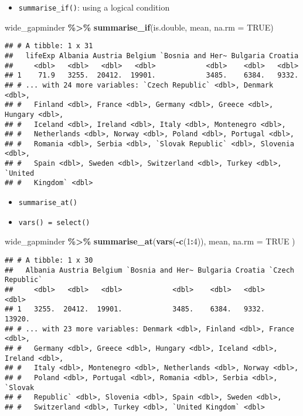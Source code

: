 \documentclass[
]{book}
\newenvironment{Shaded}{\begin{snugshade}}{\end{snugshade}}
\newcommand{\DataTypeTok}[1]{\textcolor[rgb]{0.13,0.29,0.53}{#1}}
\newcommand{\DecValTok}[1]{\textcolor[rgb]{0.00,0.00,0.81}{#1}}
\newcommand{\KeywordTok}[1]{\textcolor[rgb]{0.13,0.29,0.53}{\textbf{#1}}}
\newcommand{\NormalTok}[1]{#1}
\newcommand{\OperatorTok}[1]{\textcolor[rgb]{0.81,0.36,0.00}{\textbf{#1}}}
\newcommand{\OtherTok}[1]{\textcolor[rgb]{0.56,0.35,0.01}{#1}}
\newcommand{\StringTok}[1]{\textcolor[rgb]{0.31,0.60,0.02}{#1}}
\providecommand{\tightlist}{%
  \setlength{\itemsep}{0pt}\setlength{\parskip}{0pt}}
\begin{document}
\begin{itemize}
\tightlist
\item
  \texttt{summarise\_if()}: using a logical condition
\end{itemize}

\begin{Shaded}
\begin{Highlighting}[]
\NormalTok{wide\_gapminder }\OperatorTok{\%\textgreater{}\%}
\StringTok{  }\KeywordTok{summarise\_if}\NormalTok{(is.double, mean, }\DataTypeTok{na.rm =} \OtherTok{TRUE}\NormalTok{)}
\end{Highlighting}
\end{Shaded}

\begin{verbatim}
## # A tibble: 1 x 31
##   lifeExp Albania Austria Belgium `Bosnia and Her~ Bulgaria Croatia
##     <dbl>   <dbl>   <dbl>   <dbl>            <dbl>    <dbl>   <dbl>
## 1    71.9   3255.  20412.  19901.            3485.    6384.   9332.
## # ... with 24 more variables: `Czech Republic` <dbl>, Denmark <dbl>,
## #   Finland <dbl>, France <dbl>, Germany <dbl>, Greece <dbl>, Hungary <dbl>,
## #   Iceland <dbl>, Ireland <dbl>, Italy <dbl>, Montenegro <dbl>,
## #   Netherlands <dbl>, Norway <dbl>, Poland <dbl>, Portugal <dbl>,
## #   Romania <dbl>, Serbia <dbl>, `Slovak Republic` <dbl>, Slovenia <dbl>,
## #   Spain <dbl>, Sweden <dbl>, Switzerland <dbl>, Turkey <dbl>, `United
## #   Kingdom` <dbl>
\end{verbatim}

\begin{itemize}
\item
  \texttt{summarise\_at()}
\item
  \texttt{vars()\ =\ select()}
\end{itemize}

\begin{Shaded}
\begin{Highlighting}[]
\NormalTok{wide\_gapminder }\OperatorTok{\%\textgreater{}\%}
\StringTok{  }\KeywordTok{summarise\_at}\NormalTok{(}\KeywordTok{vars}\NormalTok{(}\OperatorTok{{-}}\KeywordTok{c}\NormalTok{(}\DecValTok{1}\OperatorTok{:}\DecValTok{4}\NormalTok{)),}
\NormalTok{    mean,}
    \DataTypeTok{na.rm =} \OtherTok{TRUE}
\NormalTok{  )}
\end{Highlighting}
\end{Shaded}

\begin{verbatim}
## # A tibble: 1 x 30
##   Albania Austria Belgium `Bosnia and Her~ Bulgaria Croatia `Czech Republic`
##     <dbl>   <dbl>   <dbl>            <dbl>    <dbl>   <dbl>            <dbl>
## 1   3255.  20412.  19901.            3485.    6384.   9332.           13920.
## # ... with 23 more variables: Denmark <dbl>, Finland <dbl>, France <dbl>,
## #   Germany <dbl>, Greece <dbl>, Hungary <dbl>, Iceland <dbl>, Ireland <dbl>,
## #   Italy <dbl>, Montenegro <dbl>, Netherlands <dbl>, Norway <dbl>,
## #   Poland <dbl>, Portugal <dbl>, Romania <dbl>, Serbia <dbl>, `Slovak
## #   Republic` <dbl>, Slovenia <dbl>, Spain <dbl>, Sweden <dbl>,
## #   Switzerland <dbl>, Turkey <dbl>, `United Kingdom` <dbl>
\end{verbatim}
\end{document}
